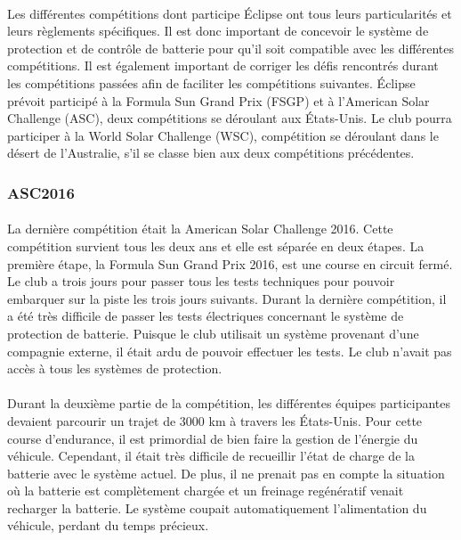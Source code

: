 		\paragraph{}
		Les différentes compétitions dont participe Éclipse ont tous leurs particularités et leurs règlements spécifiques. Il est donc important de concevoir le système de protection et de contrôle de batterie pour qu'il soit compatible avec les différentes compétitions. Il est également important de corriger les défis rencontrés durant les compétitions passées afin de faciliter les compétitions suivantes. Éclipse prévoit participé à la Formula Sun Grand Prix (FSGP) et à l'American Solar Challenge (ASC), deux compétitions se déroulant aux États-Unis. Le club pourra participer à la World Solar Challenge (WSC), compétition se déroulant dans le désert de l'Australie, s'il se classe bien aux deux compétitions précédentes.
		
	\subsubsection{ASC2016}
	
		\paragraph{}
		La dernière compétition était la American Solar Challenge 2016. Cette compétition survient tous les deux ans et elle est séparée en deux étapes. La première étape, la Formula Sun Grand Prix 2016, est une course en circuit fermé. Le club a trois jours pour passer tous les tests techniques pour pouvoir embarquer sur la piste les trois jours suivants. Durant la dernière compétition, il a été très difficile de passer les tests électriques concernant le système de protection de batterie. Puisque le club utilisait un système provenant d'une compagnie externe, il était ardu de pouvoir effectuer les tests. Le club n'avait pas accès à tous les systèmes de protection.
		
		\paragraph{}
		Durant la deuxième partie de la compétition, les différentes équipes participantes devaient parcourir un trajet de 3000 km à travers les États-Unis. Pour cette course d'endurance, il est primordial de bien faire la gestion de l'énergie du véhicule. Cependant, il était très difficile de recueillir l'état de charge de la batterie avec le système actuel. De plus, il ne prenait pas en compte la situation où la batterie est complètement chargée et un freinage regénératif venait recharger la batterie. Le système coupait automatiquement l'alimentation du véhicule, perdant du temps précieux.
		

